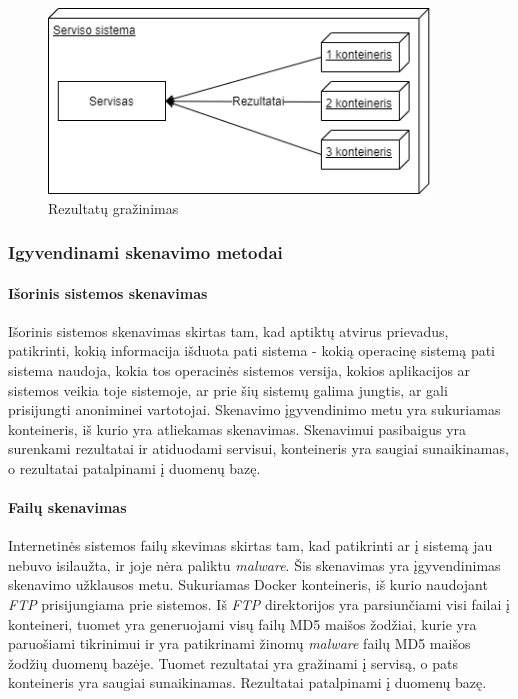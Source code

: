 \documentclass[a4paper,12pt,fleqn]{article}
\begin{document}
\begin{figure}[H]
	\centering
	\includegraphics[width=0.9\textwidth]{figs/3Containerlt.png}
	\caption{Rezultatų gražinimas}
	\label{fig:3Container}
\end{figure}

\subsubsection{Igyvendinami skenavimo metodai}



\paragraph{Išorinis sistemos skenavimas}
Išorinis sistemos skenavimas skirtas tam, kad aptiktų atvirus prievadus, patikrinti, kokią informacija išduota pati sistema - kokią operacinę sistemą pati sistema naudoja, kokia tos operacinės sistemos versija, kokios aplikacijos ar sistemos veikia toje sistemoje, ar prie šių sistemų galima jungtis, ar gali prisijungti anoniminei vartotojai. Skenavimo įgyvendinimo metu yra sukuriamas konteineris, iš kurio yra atliekamas skenavimas. Skenavimui pasibaigus yra surenkami rezultatai ir atiduodami servisui, konteineris yra saugiai sunaikinamas, o rezultatai patalpinami į duomenų bazę.
\paragraph{Failų skenavimas}
Internetinės sistemos failų skevimas skirtas tam, kad patikrinti ar į sistemą jau nebuvo isilaužta, ir joje nėra paliktu \textit{malware}. Šis skenavimas yra įgyvendinimas skenavimo užklausos metu. Sukuriamas Docker konteineris, iš kurio naudojant \textit{FTP} prisijungiama prie sistemos. Iš \textit{FTP} direktorijos yra parsiunčiami visi failai į konteineri, tuomet yra generuojami visų failų MD5 maišos žodžiai, kurie yra paruošiami tikrinimui ir yra patikrinami žinomų \textit{malware} failų MD5 maišos žodžių duomenų bazėje. Tuomet rezultatai yra gražinami į servisą, o pats konteineris yra saugiai sunaikinamas. Rezultatai patalpinami į duomenų bazę.
\end{document}
